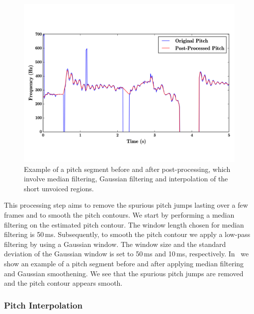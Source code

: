 {\begin{figure}
	\begin{center}
		\includegraphics[width=\figSizeHundred]{ch05_preprocessing/figures/smootheningExample.png}
	\end{center}
	\caption[Example of a post-processed predominant pitch segment]{Example of a pitch segment before and after post-processing, which involve median filtering, Gaussian filtering and interpolation of the short unvoiced regions.}
	\label{fig:smoothening_example}
\end{figure}

This processing step aims to remove the spurious pitch jumps lasting over a few frames and to smooth the pitch contours. We start by performing a median filtering on the estimated pitch contour. The window length chosen for median filtering is 50\,ms. Subsequently, to smooth the pitch contour we apply a low-pass filtering by using a Gaussian window. The window size and the standard deviation of the Gaussian window is set to 50\,ms and 10\,ms, respectively. In~ we show an example of a pitch segment before and after applying median filtering and Gaussian smoothening. We see that the spurious pitch jumps are removed and the pitch contour appears smooth.


\subsubsection{Pitch Interpolation}
\label{sec:data_processing_pitch_interpolation}

}
